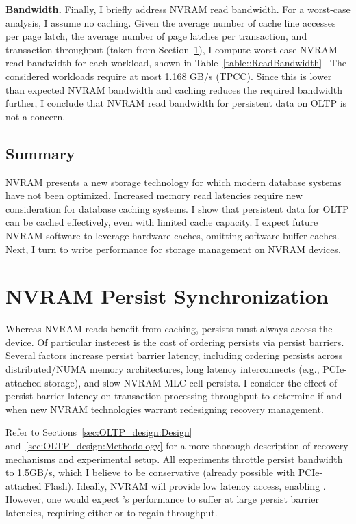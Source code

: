 \textbf{Bandwidth.}
Finally, I briefly address NVRAM read bandwidth.
For a worst-case analysis, I assume no caching.
Given the average number of cache line accesses per page latch, the average number of page latches per transaction, and transaction throughput (taken from Section~\ref{sec:OLTP_eval:Persists}), I compute worst-case NVRAM read bandwidth for each workload, shown in Table~\ref{table::ReadBandwidth}~
The considered workloads require at most 1.168 GB/s (TPCC).
Since this is lower than expected NVRAM bandwidth and caching reduces the required bandwidth further, I conclude that NVRAM read bandwidth for persistent data on OLTP is not a concern.

\subsection{Summary}
\label{sec:OLTP_eval:Reads:Summary}
NVRAM presents a new storage technology for which modern database systems have not been optimized.
Increased memory read latencies require new consideration for database caching systems.
I show that persistent data for OLTP can be cached effectively, even with limited cache capacity.
I expect future NVRAM software to leverage hardware caches, omitting software buffer caches.
Next, I turn to write performance for storage management on NVRAM devices.

\section{NVRAM Persist Synchronization}
\label{sec:OLTP_eval:Persists}

Whereas NVRAM reads benefit from caching, persists must always access the device.
Of particular insterest is the cost of ordering persists via persist barriers.
Several factors increase persist barrier latency, including ordering persists across distributed/NUMA memory architectures, long latency interconnects (e.g., PCIe-attached storage), and slow NVRAM MLC cell persists.
I consider the effect of persist barrier latency on transaction processing throughput to determine if and when new NVRAM technologies warrant redesigning recovery management.

Refer to Sections~\ref{sec:OLTP_design:Design} and~\ref{sec:OLTP_design:Methodology} for a more thorough description of recovery mechanisms and experimental setup.
All experiments throttle persist bandwidth to 1.5GB/s, which I believe to be conservative (already possible with PCIe-attached Flash).
Ideally, NVRAM will provide low latency access, enabling \InPlace.
However, one would expect \InPlace's performance to suffer at large persist barrier latencies, requiring either \NVDisk or \GroupCommit to regain throughput.

